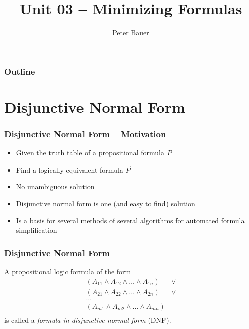 \documentclass{beamer}
\title{Unit 03 – Minimizing Formulas}
\author{Peter Bauer}
\date{} %
\theoremstyle{remark}
\begin{document}
\frame{\titlepage}

\begin{frame}
	\frametitle{Outline}
	\tableofcontents
\end{frame}

\section{Disjunctive Normal Form}
\begin{frame}
	\frametitle{Disjunctive Normal Form -- Motivation}
	\begin{itemize}
	\item Given the truth table of a propositional formula $P$
	\item Find a logically equivalent formula $P^{\prime}$
	\pause
	\item No unambiguous solution
	\pause
	\item Disjunctive normal form is one (and easy to find) solution
	\pause
	\item Is a basis for several methods of several algorithms for automated formula simplification
\end{itemize}

\end{frame}

\begin{frame}
	\frametitle{Disjunctive Normal Form}
	\begin{definition}
	A propositional logic formula of the form
	\begin{align*}
		(A_{11} \land A_{12} \land \ldots \land A_{1n}) & \lor \\
		(A_{21} \land A_{22} \land \ldots \land A_{2n}) & \lor \\
		\ldots \\
		(A_{m1} \land A_{m2} \land \ldots \land A_{mn}) & \\
	\end{align*}
	is called a {\em formula in disjunctive normal form} (DNF).
\end{definition}

\end{frame}
\end{document}
